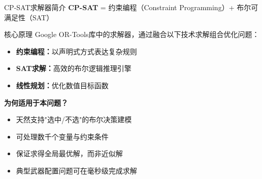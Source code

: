 \documentclass[aspectratio=169]{beamer}
\begin{document}
\begin{frame}{CP-SAT求解器简介}
    \textbf{CP-SAT} = 约束编程（Constraint Programming）+ 布尔可满足性（SAT）

    \vspace{0.3cm}
    \begin{block}{核心原理}
        Google OR-Tools库中的求解器，通过融合以下技术求解组合优化问题：
        \begin{itemize}
            \item \textbf{约束编程：}以声明式方式表达复杂规则
            \item \textbf{SAT求解：}高效的布尔逻辑推理引擎
            \item \textbf{线性规划：}优化数值目标函数
        \end{itemize}
    \end{block}

    \vspace{0.3cm}
    \textbf{为何适用于本问题？}
    \begin{itemize}
        \item 天然支持"选中/不选"的布尔决策建模
        \item 可处理数千个变量与约束条件
        \item 保证求得全局最优解，而非近似解
        \item 典型武器配置问题可在毫秒级完成求解
    \end{itemize}
\end{frame}


\end{document}
